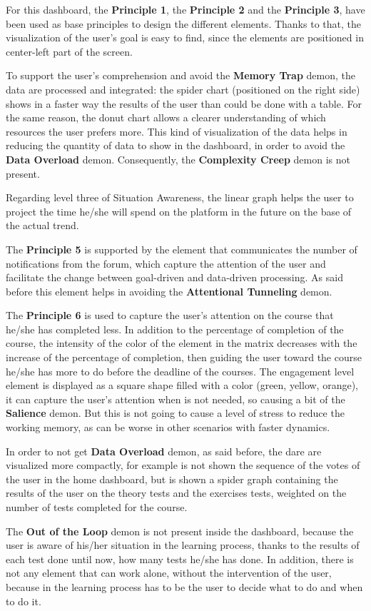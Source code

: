 For this dashboard, the \textbf{Principle 1}, the \textbf{Principle 2} and the \textbf{Principle 3},
have been used as base principles to design the different elements. Thanks to that, the 
visualization of the user's goal is easy to find, since the elements are positioned in center-left
part of the screen. 

To support the user's comprehension and avoid the 
\textbf{Memory Trap} demon, the data are processed and integrated: the spider chart
(positioned on the right side) shows in a faster way the results of the user than
could be done with a table. For the same reason, the donut chart allows a clearer 
understanding of which resources the user prefers more. This kind of visualization of the
data helps in reducing the quantity of data to show in the dashboard, in order to 
avoid the \textbf{Data Overload} demon. Consequently, the \textbf{Complexity Creep} demon is not present.

Regarding level three of
Situation Awareness, the linear graph helps the user to project the time he/she will
spend on the platform in the future on the base of the actual trend.

The \textbf{Principle 5} is supported by the element that communicates the number of 
notifications from the forum, which capture the attention of the user and
facilitate the change between goal-driven and data-driven processing. As said before
this element helps in avoiding the \textbf{Attentional Tunneling} demon.

The \textbf{Principle 6} is used to capture the user's attention on the course that
he/she has completed less. In addition to the percentage of completion of the course,
the intensity of the color of the element in the matrix decreases with the increase
of the percentage of completion, then guiding the user toward the course he/she has more to
do before the deadline of the courses. The engagement level element is displayed as a square
shape filled with a color (green, yellow, orange), it can capture the user's attention when is not needed, so 
causing a bit of the \textbf{Salience} demon. But this is not going to cause a
level of stress to reduce the working memory, as can be worse in other scenarios with 
faster dynamics.

In order to not get \textbf{Data Overload} demon, as said before, the dare are visualized
more compactly, for example is not shown the sequence of the votes of the user in
the home dashboard, but is shown a spider graph containing the results of the user on the
theory tests and the exercises tests, weighted on the number of tests completed for the course.

The \textbf{Out of the Loop} demon is not present inside the dashboard, because
the user is aware of his/her situation in the learning process, thanks to the results of each
test done until now, how many tests he/she has done. In addition, there is not any 
element that can work alone, without the intervention of the user, because in the 
learning process has to be the user to decide what to do and when to do it.